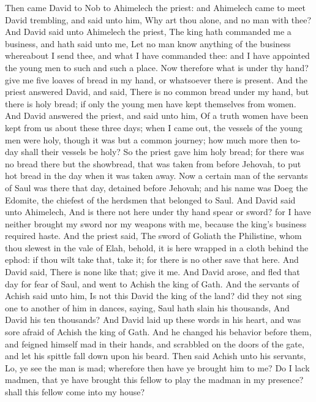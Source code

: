 Then came David to Nob to Ahimelech the priest: and Ahimelech came to meet David trembling, and said unto him, Why art thou alone, and no man with thee? And David said unto Ahimelech the priest, The king hath commanded me a business, and hath said unto me, Let no man know anything of the business whereabout I send thee, and what I have commanded thee: and I have appointed the young men to such and such a place. Now therefore what is under thy hand? give me five loaves of bread in my hand, or whatsoever there is present. And the priest answered David, and said, There is no common bread under my hand, but there is holy bread; if only the young men have kept themselves from women. And David answered the priest, and said unto him, Of a truth women have been kept from us about these three days; when I came out, the vessels of the young men were holy, though it was but a common journey; how much more then to-day shall their vessels be holy? So the priest gave him holy bread; for there was no bread there but the showbread, that was taken from before Jehovah, to put hot bread in the day when it was taken away.  Now a certain man of the servants of Saul was there that day, detained before Jehovah; and his name was Doeg the Edomite, the chiefest of the herdsmen that belonged to Saul. And David said unto Ahimelech, And is there not here under thy hand spear or sword? for I have neither brought my sword nor my weapons with me, because the king’s business required haste. And the priest said, The sword of Goliath the Philistine, whom thou slewest in the vale of Elah, behold, it is here wrapped in a cloth behind the ephod: if thou wilt take that, take it; for there is no other save that here. And David said, There is none like that; give it me.  And David arose, and fled that day for fear of Saul, and went to Achish the king of Gath. And the servants of Achish said unto him, Is not this David the king of the land? did they not sing one to another of him in dances, saying, Saul hath slain his thousands, And David his ten thousands?  And David laid up these words in his heart, and was sore afraid of Achish the king of Gath. And he changed his behavior before them, and feigned himself mad in their hands, and scrabbled on the doors of the gate, and let his spittle fall down upon his beard. Then said Achish unto his servants, Lo, ye see the man is mad; wherefore then have ye brought him to me? Do I lack madmen, that ye have brought this fellow to play the madman in my presence? shall this fellow come into my house? 

